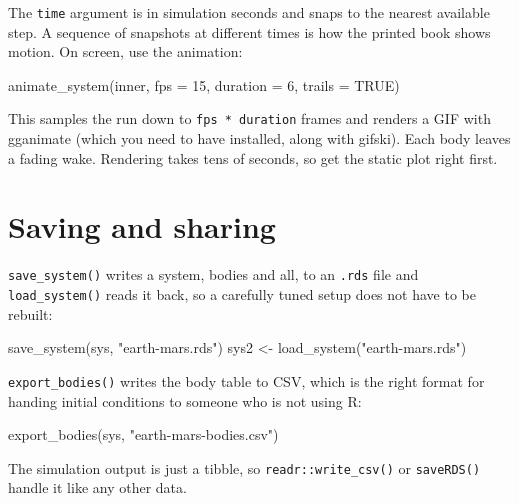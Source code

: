 \documentclass[
  10.5pt,
  letterpaper,
]{scrbook}
\newenvironment{Shaded}{\begin{snugshade}}{\end{snugshade}}
\newcommand{\AttributeTok}[1]{\textcolor[rgb]{0.00,0.00,0.00}{#1}}
\newcommand{\ConstantTok}[1]{\textcolor[rgb]{0.00,0.00,0.00}{#1}}
\newcommand{\DecValTok}[1]{\textcolor[rgb]{0.00,0.00,0.00}{#1}}
\newcommand{\FunctionTok}[1]{\textcolor[rgb]{0.00,0.00,0.00}{#1}}
\newcommand{\NormalTok}[1]{\textcolor[rgb]{0.00,0.00,0.00}{#1}}
\newcommand{\OtherTok}[1]{\textcolor[rgb]{0.00,0.00,0.00}{#1}}
\newcommand{\StringTok}[1]{\textcolor[rgb]{0.00,0.00,0.00}{#1}}
\theoremstyle{definition}
\theoremstyle{plain}
\theoremstyle{remark}
\begin{document}
The \texttt{time} argument is in simulation seconds and snaps to the
nearest available step. A sequence of snapshots at different times is
how the printed book shows motion. On screen, use the animation:

\begin{Shaded}
\begin{Highlighting}[]
\FunctionTok{animate\_system}\NormalTok{(inner, }\AttributeTok{fps =} \DecValTok{15}\NormalTok{, }\AttributeTok{duration =} \DecValTok{6}\NormalTok{, }\AttributeTok{trails =} \ConstantTok{TRUE}\NormalTok{)}
\end{Highlighting}
\end{Shaded}

This samples the run down to \texttt{fps\ *\ duration} frames and
renders a GIF with gganimate (which you need to have installed, along
with gifski). Each body leaves a fading wake. Rendering takes tens of
seconds, so get the static plot right first.

\section{Saving and sharing}\label{saving-and-sharing}

\texttt{save\_system()} writes a system, bodies and all, to an
\texttt{.rds} file and \texttt{load\_system()} reads it back, so a
carefully tuned setup does not have to be rebuilt:

\begin{Shaded}
\begin{Highlighting}[]
\FunctionTok{save\_system}\NormalTok{(sys, }\StringTok{"earth{-}mars.rds"}\NormalTok{)}
\NormalTok{sys2 }\OtherTok{\textless{}{-}} \FunctionTok{load\_system}\NormalTok{(}\StringTok{"earth{-}mars.rds"}\NormalTok{)}
\end{Highlighting}
\end{Shaded}

\texttt{export\_bodies()} writes the body table to CSV, which is the
right format for handing initial conditions to someone who is not using
R:

\begin{Shaded}
\begin{Highlighting}[]
\FunctionTok{export\_bodies}\NormalTok{(sys, }\StringTok{"earth{-}mars{-}bodies.csv"}\NormalTok{)}
\end{Highlighting}
\end{Shaded}

The simulation output is just a tibble, so \texttt{readr::write\_csv()}
or \texttt{saveRDS()} handle it like any other data.
\end{document}
